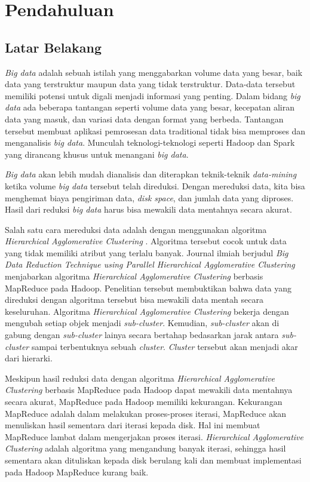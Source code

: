 \chapter{Pendahuluan}
\label{chap:intro}
   
\section{Latar Belakang}
\label{sec:label}

{\it Big data} adalah sebuah istilah yang menggabarkan volume data yang besar, baik data yang terstruktur maupun data yang tidak terstruktur. Data-data tersebut memiliki potensi untuk digali menjadi informasi yang penting. Dalam bidang {\it big data} ada  beberapa tantangan seperti volume data yang besar, kecepatan aliran data yang masuk, dan variasi data dengan format yang berbeda. Tantangan tersebut membuat aplikasi pemrosesan data traditional  tidak bisa memproses dan menganalisis {\it big data}. Munculah teknologi-teknologi seperti Hadoop dan Spark yang dirancang khusus untuk menangani {\it big data}. 

{\it Big data} akan lebih mudah dianalisis dan diterapkan teknik-teknik {\it data-mining} ketika volume {\it big data} tersebut telah direduksi. Dengan mereduksi data, kita bisa menghemat biaya pengiriman data, {\it disk space}, dan jumlah data yang diproses. Hasil dari reduksi {\it big data} harus bisa mewakili data mentahnya secara akurat. 

Salah satu cara mereduksi data adalah dengan menggunakan algoritma {\it Hierarchical Agglomerative Clustering }. Algoritma tersebut cocok untuk data yang tidak memiliki atribut yang terlalu banyak. Journal ilmiah berjudul {\it Big Data Reduction Technique using Parallel Hierarchical Agglomerative Clustering} menjabarkan algoritma {\it Hierarchical Agglomerative Clustering} berbasis MapReduce pada Hadoop. Penelitian tersebut membuktikan bahwa data yang direduksi dengan algoritma tersebut bisa mewakili data mentah secara keseluruhan. Algoritma {\it Hierarchical Agglomerative Clustering} bekerja dengan mengubah setiap objek menjadi {\it sub-cluster}. Kemudian, {\it sub-cluster} akan di gabung dengan {\it sub-cluster} lainya secara bertahap bedasarkan jarak antara {\it sub-cluster} sampai terbentuknya sebuah \textit{cluster}. {\it Cluster} tersebut akan menjadi akar dari hierarki.

Meskipun hasil reduksi data dengan algoritma {\it Hierarchical Agglomerative Clustering} berbasis MapReduce pada Hadoop dapat mewakili data mentahnya secara akurat, MapReduce pada Hadoop memiliki kekurangan. Kekurangan MapReduce adalah dalam melakukan proses-proses iterasi, MapReduce akan menuliskan hasil sementara dari iterasi kepada disk. Hal ini membuat MapReduce lambat dalam mengerjakan proses iterasi. {\it Hierarchical Agglomerative Clustering} adalah algoritma yang mengandung banyak iterasi, sehingga hasil sementara akan dituliskan kepada disk berulang kali dan membuat implementasi pada Hadoop MapReduce kurang baik.

